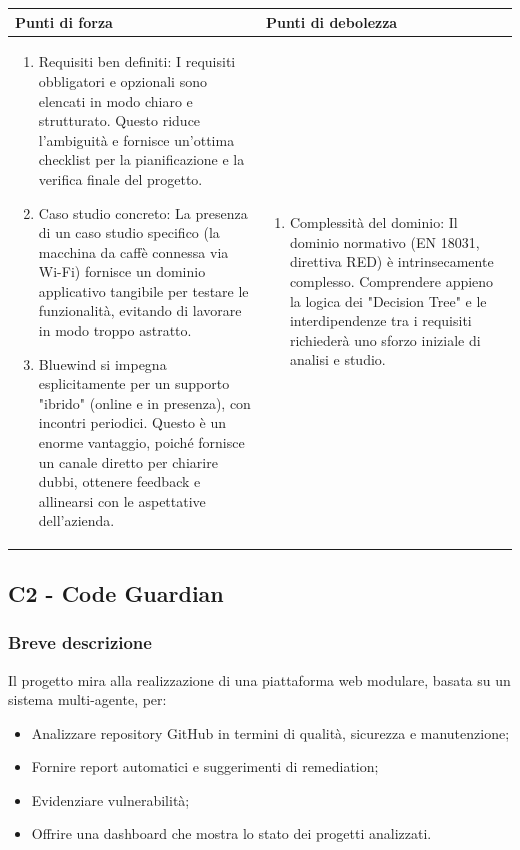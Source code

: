\documentclass[a4paper,11pt]{article}
\begin{document}
{\footnotesize
\begin{tabularx}{\textwidth}{|X|X|}
\hline
\rowcolor{lightgray!40} %
\textbf{Punti di forza} & \textbf{Punti di debolezza} \\
\hline
\begin{enumerate}
\item Requisiti ben definiti: I requisiti obbligatori e opzionali sono elencati in modo chiaro e strutturato. Questo riduce l'ambiguità e fornisce un'ottima checklist per la pianificazione e la verifica finale del progetto.
\item Caso studio concreto: La presenza di un caso studio specifico (la macchina da caffè connessa via Wi-Fi) fornisce un dominio applicativo tangibile per testare le funzionalità, evitando di lavorare in modo troppo astratto.

\item Bluewind si impegna esplicitamente per un supporto "ibrido" (online e in presenza), con incontri periodici. Questo è un enorme vantaggio, poiché fornisce un canale diretto per chiarire dubbi, ottenere feedback e allinearsi con le aspettative dell'azienda.

\end{enumerate}
 & \begin{enumerate}
\item Complessità del dominio: Il dominio normativo (EN 18031, direttiva RED) è intrinsecamente complesso. Comprendere appieno la logica dei "Decision Tree" e le interdipendenze tra i requisiti richiederà uno sforzo iniziale di analisi e studio.
\end{enumerate} \\
\hline
\end{tabularx}
}

\subsection{C2 - Code Guardian}
\subsubsection{Breve descrizione}
Il progetto mira alla realizzazione di una piattaforma web modulare, basata su un sistema multi-agente, per:

\begin{itemize}[leftmargin=*]
    \item Analizzare repository GitHub in termini di qualità, sicurezza e manutenzione;
    \item Fornire report automatici e suggerimenti di remediation;
    \item Evidenziare vulnerabilità;
    \item Offrire una dashboard che mostra lo stato dei progetti analizzati.
\end{itemize}
\end{document}
